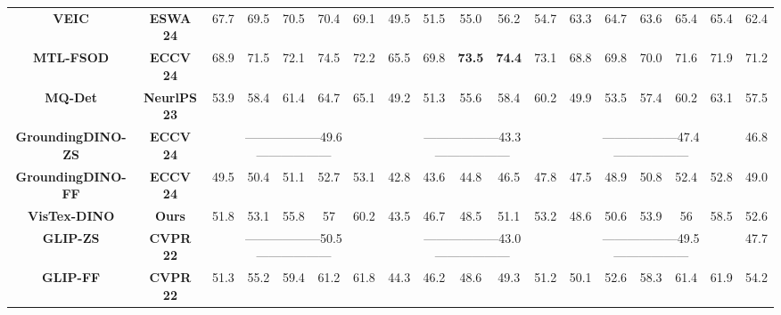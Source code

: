 \documentclass[10pt,twocolumn,letterpaper]{article}
\begin{document}
\begin{table}[t]
{\begin{tabular}{cccccccccccccccccc}
    \textbf{VEIC \cite{zhao2024veic}} & \multicolumn{1}{c|}{\textbf{ESWA 24}} & 67.7 & 69.5 & 70.5 & 70.4 & \multicolumn{1}{c|}{69.1} & 49.5 & 51.5 & 55.0 & 56.2 & \multicolumn{1}{c|}{54.7} & 63.3 & 64.7 & 63.6 & 65.4 & \multicolumn{1}{c|}{65.4} & 62.4 \\
    \textbf{MTL-FSOD \cite{ren2024MTL-FSOD}} & \multicolumn{1}{c|}{\textbf{ECCV 24}} & 68.9 & 71.5 & 72.1 & 74.5 & \multicolumn{1}{c|}{72.2} & 65.5 & 69.8 & \textbf{73.5} & \textbf{74.4} & \multicolumn{1}{c|}{73.1} & 68.8 & 69.8 & 70.0 & 71.6 & \multicolumn{1}{c|}{71.9} & 71.2 \\
    
    \textbf{MQ-Det \cite{xu2023mqdet}} & \multicolumn{1}{c|}{\textbf{NeurlPS 23}} & 53.9 & 58.4 & 61.4 & 64.7 & \multicolumn{1}{c|}{65.1} & 49.2 & 51.3 & 55.6 & 58.4 & \multicolumn{1}{c|}{60.2} & 49.9 & 53.5 & 57.4 & 60.2 & \multicolumn{1}{c|}{63.1} & 57.5 \\
     
    \textbf{GroundingDINO-ZS} & \multicolumn{1}{c|}{\textbf{ECCV 24}} & \multicolumn{5}{c|}{------------------49.6------------------} & \multicolumn{5}{c|}{------------------43.3------------------} & \multicolumn{5}{c|}{------------------47.4------------------} & 46.8  \\
     
    \textbf{GroundingDINO-FF} & \multicolumn{1}{c|}{\textbf{ECCV 24}} & 49.5 & 50.4 & 51.1 & 52.7 & \multicolumn{1}{c|}{53.1} & 42.8 & 43.6 & 44.8 & 46.5 & \multicolumn{1}{c|}{47.8} & 47.5 & 48.9 & 50.8 & 52.4 & \multicolumn{1}{c|}{52.8} & 49.0 \\
     
    \textbf{VisTex-DINO} & \multicolumn{1}{c|}{\textbf{Ours}} & 51.8 & 53.1 & 55.8 & 57 & \multicolumn{1}{c|}{60.2} & 43.5 & 46.7 & 48.5 & 51.1 & \multicolumn{1}{c|}{53.2} & 48.6 & 50.6 & 53.9 & 56 & \multicolumn{1}{c|}{58.5} & 52.6 \\
     
    \textbf{GLIP-ZS} & \multicolumn{1}{c|}{\textbf{CVPR 22}} & \multicolumn{5}{c|}{------------------50.5------------------} & \multicolumn{5}{c|}{------------------43.0------------------} & \multicolumn{5}{c|}{------------------49.5------------------} & 47.7 \\
     
    \textbf{GLIP-FF} & \multicolumn{1}{c|}{\textbf{CVPR 22}} & 51.3 & 55.2 & 59.4 & 61.2 & \multicolumn{1}{c|}{61.8} & 44.3 & 46.2 & 48.6 & 49.3 & \multicolumn{1}{c|}{51.2} & 50.1 & 52.6 & 58.3 & 61.4 & \multicolumn{1}{c|}{61.9} & 54.2 \\
     

\end{tabular}}
\end{table}
\end{document}
